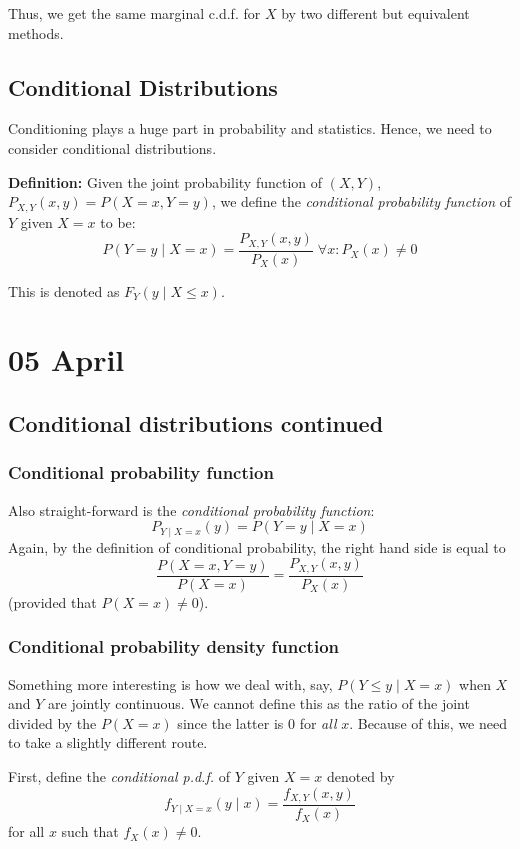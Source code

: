\documentclass[12pt]{article}
\begin{document}
Thus, we get the same marginal c.d.f. for $X$ by two different but equivalent methods.

\subsection{Conditional Distributions}
Conditioning plays a huge part in probability and statistics. Hence, we need to consider conditional distributions.

\textbf{Definition:} Given the joint probability function of $(X,Y)$, $P_{X,Y} (x,y) = P(X = x, Y = y)$, we define the \emph{conditional probability function} of $Y$ given $X = x$ to be:
\[
    P(Y = y \; | \; X = x) = \frac{P_{X,Y} (x,y)}{P_X (x)} \; \forall x : P_X (x) \neq 0
\]

This is denoted as $F_{Y} (y \; | \; X \leq x)$.
\section{05 April}
\subsection{Conditional distributions continued}
\subsubsection{Conditional probability function}
Also straight-forward is the \emph{conditional probability function}:
\[
    P_{Y \; | \; X = x} (y) = P(Y = y \; | \; X = x)
\]
Again, by the definition of conditional probability, the right hand side is equal to
\[
    \frac{P(X = x, Y = y)}{P(X = x)} = \frac{P_{X,Y} (x,y)}{P_X (x)}
\]
(provided that $P(X = x) \neq 0$).

\subsubsection{Conditional probability density function}
Something more interesting is how we deal with, say, $P(Y \leq y \; | \; X = x)$ when $X$ and $Y$ are jointly continuous. We cannot define this as the ratio of the joint divided by the $P(X = x)$ since the latter is $0$ for \emph{all} $x$. Because of this, we need to take a slightly different route. 

First, define the \emph{conditional p.d.f.} of $Y$ given $X=x$ denoted by 
\[
    f_{Y \; | \; X = x} (y \; | \; x) = \frac{f_{X,Y} (x,y)}{f_X (x)}
\]
for all $x$ such that $f_X (x) \neq 0$. 
\end{document}

